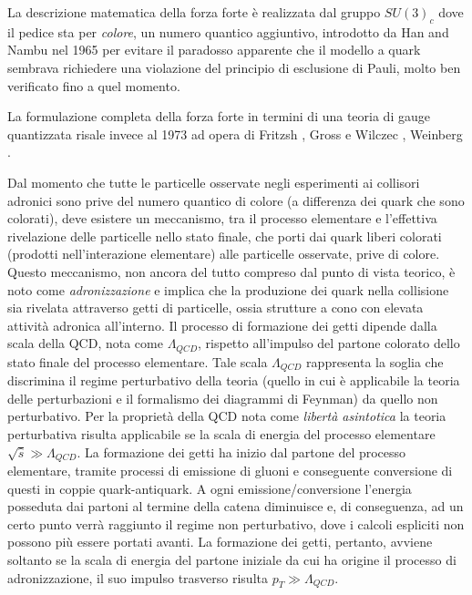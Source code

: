 \medskip
La descrizione matematica della forza forte è realizzata dal gruppo $SU(3)_{c}$ dove il pedice sta per \textit{colore}, un 
numero quantico aggiuntivo, introdotto da Han and Nambu \cite{nambu} nel 1965 per evitare il paradosso apparente che il modello a quark
sembrava richiedere una violazione del principio di esclusione di Pauli, molto ben verificato fino a quel momento.

\medskip
La formulazione completa della forza forte in termini di una teoria di gauge quantizzata risale invece al 1973 ad 
opera di Fritzsh \cite{Fritzsh},
Gross e Wilczec \cite{Gross}, Weinberg \cite{Weinberg}.

\medskip
Dal momento che tutte le particelle osservate negli esperimenti ai collisori adronici sono prive del numero quantico di colore (a differenza dei quark che sono colorati), deve
esistere un meccanismo, tra il processo elementare e l'effettiva rivelazione delle particelle nello stato finale, che porti dai quark
liberi colorati (prodotti nell'interazione elementare) alle particelle osservate, prive di colore.
\newline
Questo meccanismo, non ancora del tutto compreso dal punto di vista teorico, è noto come \textit{adronizzazione} e implica che la produzione dei quark nella collisione sia rivelata attraverso getti
di particelle, ossia strutture a cono con elevata attività adronica all'interno. Il processo di formazione dei getti dipende dalla scala della QCD, nota come $\Lambda_{QCD}$, rispetto all'impulso del
partone colorato dello stato finale del processo elementare. Tale scala $\Lambda_{QCD}$ rappresenta la soglia che discrimina 
il regime perturbativo della teoria (quello in cui è applicabile la teoria delle perturbazioni e il formalismo dei diagrammi
di Feynman) da quello non perturbativo. Per la proprietà della QCD nota come \textit{libertà asintotica} la teoria perturbativa risulta applicabile
se la scala di energia del processo elementare $\sqrt{\hat{s}}\gg\Lambda_{QCD}$. La formazione dei getti ha inizio dal partone del processo elementare, 
tramite processi di emissione di gluoni e conseguente
conversione di questi in coppie quark-antiquark. A ogni emissione/conversione l'energia posseduta dai partoni al termine della 
catena diminuisce e, di conseguenza, ad un certo punto verrà raggiunto il regime non perturbativo, dove i calcoli espliciti non
possono più essere portati avanti.
La formazione dei getti, pertanto, avviene soltanto se la scala di energia del partone iniziale da cui ha origine il processo
di adronizzazione, il suo impulso trasverso risulta $p_{T}\gg\Lambda_{QCD}$.

